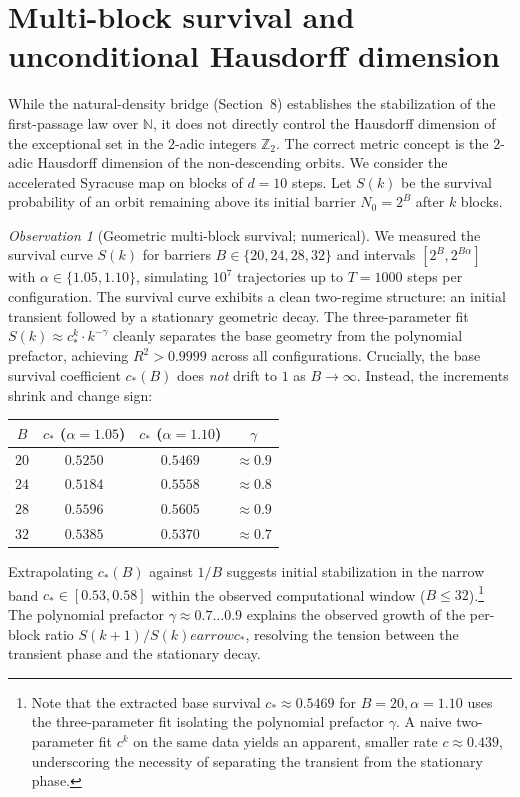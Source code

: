 \documentclass[12pt,a4paper]{article}
\theoremstyle{remark}
\newtheorem{observation}[theorem]{Observation}
\begin{document}
\section{Multi-block survival and unconditional Hausdorff dimension}
While the natural-density bridge (Section~8) establishes the stabilization of the first-passage law over $\mathbb{N}$, it does not directly control the Hausdorff dimension of the exceptional set in the $2$-adic integers $\mathbb{Z}_2$. The correct metric concept is the $2$-adic Hausdorff dimension of the non-descending orbits.
We consider the accelerated Syracuse map on blocks of $d=10$ steps. Let $S(k)$ be the survival probability of an orbit remaining above its initial barrier $N_0=2^B$ after $k$ blocks.
\begin{observation}[Geometric multi-block survival; numerical]
We measured the survival curve $S(k)$ for barriers $B\in\{20, 24, 28, 32\}$ and intervals $[2^B, 2^{B\alpha}]$ with $\alpha\in\{1.05, 1.10\}$, simulating $10^7$ trajectories up to $T=1000$ steps per configuration.
The survival curve exhibits a clean two-regime structure: an initial transient followed by a stationary geometric decay.
The three-parameter fit $S(k) \approx c_*^k \cdot k^{-\gamma}$ cleanly separates the base geometry from the polynomial prefactor, achieving $R^2 > 0.9999$ across all configurations.
Crucially, the base survival coefficient $c_*(B)$ does \emph{not} drift to $1$ as $B\to\infty$. Instead, the increments shrink and change sign:
\begin{center}
\begin{tabular}{c|ccc}
$B$ & $c_*$ ($\alpha=1.05$) & $c_*$ ($\alpha=1.10$) & $\gamma$ \\ \hline
$20$ & $0.5250$ & $0.5469$ & $\approx 0.9$ \\
$24$ & $0.5184$ & $0.5558$ & $\approx 0.8$ \\
$28$ & $0.5596$ & $0.5605$ & $\approx 0.9$ \\
$32$ & $0.5385$ & $0.5370$ & $\approx 0.7$
\end{tabular}
\end{center}
Extrapolating $c_*(B)$ against $1/B$ suggests initial stabilization in the narrow band $c_* \in [0.53, 0.58]$ within the observed computational window ($B \le 32$).\footnote{Note that the extracted base survival $c_* \approx 0.5469$ for $B=20, \alpha=1.10$ uses the three-parameter fit isolating the polynomial prefactor $\gamma$. A naive two-parameter fit $c^k$ on the same data yields an apparent, smaller rate $c \approx 0.439$, underscoring the necessity of separating the transient from the stationary phase.} The polynomial prefactor $\gamma \approx 0.7\dots 0.9$ explains the observed growth of the per-block ratio $S(k+1)/S(k)
earrow c_*$, resolving the tension between the transient phase and the stationary decay.
\end{observation}
\end{document}
